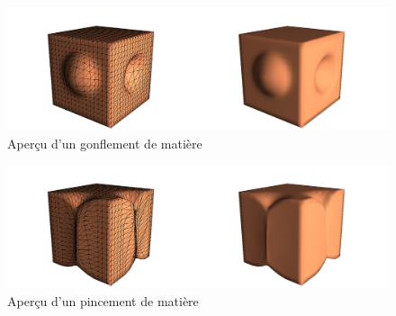 \documentclass[a4paper]{memoir}
\begin{document}
			\begin{figure}[H]
				\vspace{-0,5cm} \hspace{-2cm} \includegraphics[scale=0.27]{img/inflate.png}
				\caption{Aperçu d'un gonflement de matière}
			\end{figure}
			\begin{figure}[H]
				\vspace{-0,5cm} \hspace{-2cm} \includegraphics[scale=0.27]{img/pinch.png}
				\caption{Aperçu d'un pincement de matière}
			\end{figure}
		
\end{document}
